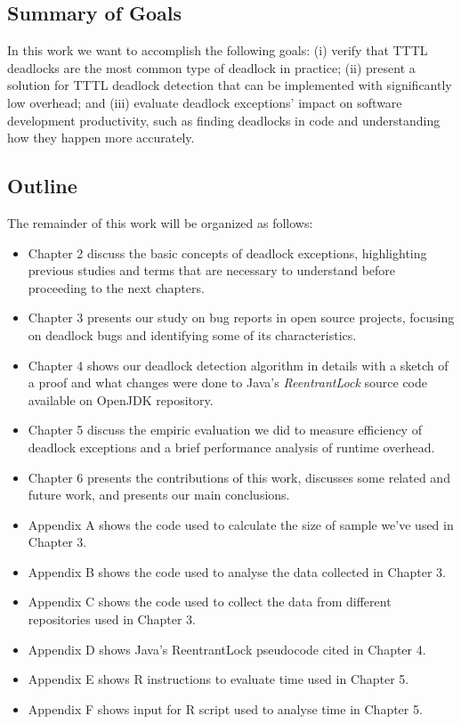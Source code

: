 \subsection{Summary of Goals}

In this work we want to accomplish the following goals:
(i) verify that TTTL deadlocks are the most common type of deadlock in practice;
(ii) present a solution for TTTL deadlock detection that can be implemented with significantly low overhead;
and (iii) evaluate deadlock exceptions' impact on software development productivity, such as finding deadlocks in code and understanding how they happen more accurately.

\subsection{Outline}

The remainder of this work will be organized as follows:

\begin{itemize}
  \item Chapter 2 discuss the basic concepts of deadlock exceptions, highlighting previous studies and terms that are necessary to understand before proceeding to the next chapters.
  \item Chapter 3 presents our study on bug reports in open source projects, focusing on deadlock bugs and identifying some of its characteristics.
  \item Chapter 4 shows our deadlock detection algorithm in details with a sketch of a proof and what changes were done to Java's \emph{ReentrantLock} source code available on OpenJDK repository.
  \item Chapter 5 discuss the empiric evaluation we did to measure efficiency of deadlock exceptions and a brief performance analysis of runtime overhead.
  \item Chapter 6 presents the contributions of this work, discusses some related and future work, and presents our main conclusions.
  \item Appendix A shows the code used to calculate the size of sample we've used in Chapter 3.
  \item Appendix B shows the code used to analyse the data collected in Chapter 3.
  \item Appendix C shows the code used to collect the data from different repositories used in Chapter 3.
  \item Appendix D shows Java's ReentrantLock pseudocode cited in Chapter 4.
  \item Appendix E shows R instructions to evaluate time used in Chapter 5.
  \item Appendix F shows input for R script used to analyse time in Chapter 5.
\end{itemize}



